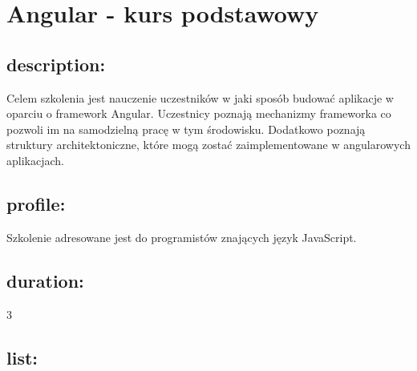 \documentclass{article}[10pt]
\begin{document}
\newpage


    
	\section{Angular - kurs podstawowy}

	\subsection*{description:}
	\begin{adjustwidth}{2cm}{}
		
Celem szkolenia jest nauczenie uczestników w jaki sposób budować aplikacje w oparciu o framework Angular. Uczestnicy poznają mechanizmy frameworka co pozwoli im na samodzielną pracę w tym środowisku. Dodatkowo poznają struktury architektoniczne, które mogą zostać zaimplementowane w angularowych aplikacjach. 

	\end{adjustwidth}
	\subsection*{profile:}
\begin{adjustwidth}{2cm}{}
	
Szkolenie adresowane jest do programistów znających język JavaScript.
\end{adjustwidth}
	\subsection*{duration:}
\begin{adjustwidth}{2cm}{}
	3
\end{adjustwidth}

	\subsection*{list:}
\begin{adjustwidth}{1.5cm}{}
	\begin{itemize}

























	\end{itemize}
\end{adjustwidth}
\end{document}
